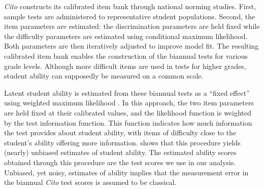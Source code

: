 \textit{Cito} constructs its calibrated item bank through national norming studies. First, sample tests are administered to representative student populations. Second, the item parameters are estimated: the discrimination parameters are held fixed while the difficulty parameters are estimated using conditional maximum likelihood. Both parameters are then iteratively adjusted to improve model fit. The resulting calibrated item bank enables the construction of the biannual tests for various grade levels. Although more difficult items are used in tests for higher grades, student ability can supposedly be measured on a common scale.

Latent student ability is estimated from these biannual tests as a ``fixed effect'' using weighted maximum likelihood \citep{sanders1993psychometrie}. In this approach, the two item parameters are held fixed at their calibrated values, and the likelihood function is weighted by the test information function. This function indicates how much information the test provides about student ability, with items of difficulty close to the student’s ability offering more information. \cite{warm1989weighted} shows that this procedure yields (nearly) unbiased estimates of student ability. The estimated ability scores obtained through this procedure are the test scores we use in our analysis. Unbiased, yet noisy, estimates of ability implies that the measurement error in the biannual \textit{Cito} test scores is assumed to be classical.
